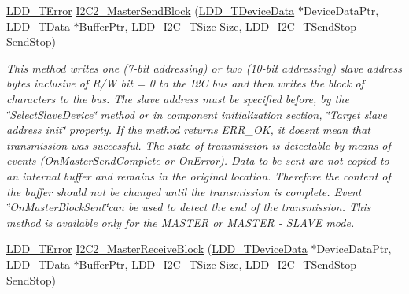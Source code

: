 \begin{DoxyCompactItemize}
\hyperlink{group___p_e___types__module_ga24c2b045fd04e79e85f261ce4df35588}{L\+D\+D\+\_\+\+T\+Error} \hyperlink{group___i2_c2__module_ga1e8de45614939de2c1cb5a8b8fb849b9}{I2\+C2\+\_\+\+Master\+Send\+Block} (\hyperlink{group___p_e___types__module_gac5cf1362f1f0e3a2ce71b1bf2276d091}{L\+D\+D\+\_\+\+T\+Device\+Data} $\ast$Device\+Data\+Ptr, \hyperlink{group___p_e___types__module_gade8ef9401405bd941b6da738b807f980}{L\+D\+D\+\_\+\+T\+Data} $\ast$Buffer\+Ptr, \hyperlink{group___p_e___types__module_gaa7fd2bc3f1f93e051058f9e70349c2b9}{L\+D\+D\+\_\+\+I2\+C\+\_\+\+T\+Size} Size, \hyperlink{group___p_e___types__module_gacac4ade6fbcd28c9ddcd864242063ec8}{L\+D\+D\+\_\+\+I2\+C\+\_\+\+T\+Send\+Stop} Send\+Stop)
\begin{DoxyCompactList}\small\item\em This method writes one (7-\/bit addressing) or two (10-\/bit addressing) slave address bytes inclusive of R/W bit = 0 to the I2C bus and then writes the block of characters to the bus. The slave address must be specified before, by the \char`\"{}\+Select\+Slave\+Device\char`\"{} method or in component initialization section, \char`\"{}\+Target slave address init\char`\"{} property. If the method returns E\+R\+R\+\_\+\+OK, it doesn\textquotesingle{}t mean that transmission was successful. The state of transmission is detectable by means of events (On\+Master\+Send\+Complete or On\+Error). Data to be sent are not copied to an internal buffer and remains in the original location. Therefore the content of the buffer should not be changed until the transmission is complete. Event \char`\"{}\+On\+Master\+Block\+Sent\char`\"{}can be used to detect the end of the transmission. This method is available only for the M\+A\+S\+T\+ER or M\+A\+S\+T\+ER -\/ S\+L\+A\+VE mode. \end{DoxyCompactList}\item 
\hyperlink{group___p_e___types__module_ga24c2b045fd04e79e85f261ce4df35588}{L\+D\+D\+\_\+\+T\+Error} \hyperlink{group___i2_c2__module_ga782ad56e307e99306dfcbb7359a712af}{I2\+C2\+\_\+\+Master\+Receive\+Block} (\hyperlink{group___p_e___types__module_gac5cf1362f1f0e3a2ce71b1bf2276d091}{L\+D\+D\+\_\+\+T\+Device\+Data} $\ast$Device\+Data\+Ptr, \hyperlink{group___p_e___types__module_gade8ef9401405bd941b6da738b807f980}{L\+D\+D\+\_\+\+T\+Data} $\ast$Buffer\+Ptr, \hyperlink{group___p_e___types__module_gaa7fd2bc3f1f93e051058f9e70349c2b9}{L\+D\+D\+\_\+\+I2\+C\+\_\+\+T\+Size} Size, \hyperlink{group___p_e___types__module_gacac4ade6fbcd28c9ddcd864242063ec8}{L\+D\+D\+\_\+\+I2\+C\+\_\+\+T\+Send\+Stop} Send\+Stop)

\end{DoxyCompactItemize}
